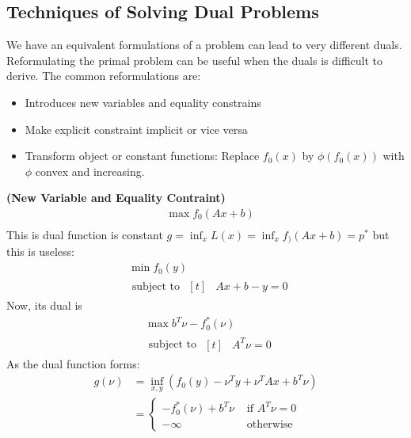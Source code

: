 \subsection{Techniques of Solving Dual Problems}

\begin{remark}
    We have an equivalent formulations of a problem can lead to very different duals. Reformulating the primal problem can be useful when the duals is difficult to derive. The common reformulations are:
    \begin{itemize}
        \item Introduces new variables and equality constrains 
        \item Make explicit constraint implicit or vice versa
        \item Transform object or constant functions: Replace $f_0(x)$ by $\phi(f_0(x))$ with $\phi$ convex and increasing.
    \end{itemize}
\end{remark}

\begin{definition}{\textbf{(New Variable and Equality Contraint)}}
    \begin{equation*}
    \begin{aligned}
        &\max f_0(Ax+b) \\
    \end{aligned}
    \end{equation*}
    This is dual function is constant $g=\inf_x L(x) = \inf_x f_)(Ax+b) = p^*$ but this is useless:
    \begin{equation*}
    \begin{aligned}
        &\min f_0(y) \\
        &\text{ subject to } \begin{aligned}[t]
            &Ax+b-y=0
        \end{aligned}
    \end{aligned}
    \end{equation*}
    Now, its dual is 
    \begin{equation*}
    \begin{aligned}
        &\max b^T\nu - f_0^*(\nu) \\
        &\text{ subject to } \begin{aligned}[t]
            &A^T\nu = 0
        \end{aligned}
    \end{aligned}
    \end{equation*}
    As the dual function forms:
    \begin{equation*}
    \begin{aligned}
        g(\nu) &= \inf_{x, y} (f_0(y) -\nu^Ty + \nu^TAx + b^T\nu) \\ 
        &= \begin{cases}
            -f_0^*(\nu) + b^T\nu & \text{ if } A^T\nu=0 \\
            -\infty &\text{ otherwise }
        \end{cases}
    \end{aligned}
    \end{equation*}
\end{definition}


